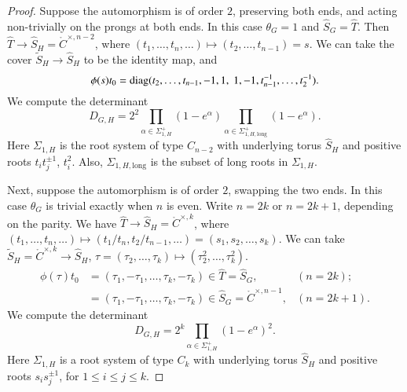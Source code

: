\begin{proof}
Suppose the automorphism is of order $2$, preserving both ends, and acting non-trivially on the prongs at both ends.
In this case $\theta_G=1$ and $\hat S_G = \hat T$.
Then $\hat T\to \hat S_H = \ring{C}^{\times,n-2}$, where $(t_1,\ldots,t_n,\ldots)\mapsto (t_2,\ldots,t_{n-1})=s$.
We can take the cover $\tilde S_H\to \hat S_H$ to be the identity map, and
\[
\phi(s)t_0 = \op{diag}(t_2,\ldots,t_{n-1},-1,1,\ 1,-1,t_{n-1}^{-1},\ldots,t_2^{-1}).
\]
We compute the determinant
\begin{equation}
D_{G,H} = 2^2 \prod_{\alpha\in \Sigma^+_{1,H}} (1-e^\alpha) \prod_{\alpha\in \Sigma^+_{1,H,\text{long}}} (1-e^\alpha).
\end{equation}
Here $\Sigma_{1,H}$ is the root system of type $C_{n-2}$ with underlying torus $\hat S_H$ and positive roots $t_i t_j^{\pm 1}$, $t_i^2$.
Also, $\Sigma_{1,H,\text{long}}$ is the subset of long roots in $\Sigma_{1,H}$.

Next, suppose the automorphism is of order $2$, swapping the two ends.
In this case $\theta_G$ is trivial exactly when $n$ is even.    
Write $n=2k$ or $n=2k+1$, depending on the parity.
We have $\hat T\to \hat S_H = \ring{C}^{\times,k}$, where $(t_1,\ldots,t_n,\ldots)\mapsto (t_1/t_n,t_2/t_{n-1},\ldots) = (s_1,s_2,\ldots,s_k)$.
We can take $\tilde S_H =\ring{C}^{\times,k}\to \hat S_H$, $\tau = (\tau_2,\ldots,\tau_k)\mapsto (\tau_2^2,\ldots,\tau_k^2)$.
\begin{align*}
\phi(\tau)t_0 &= (\tau_1,-\tau_1,\ldots,\tau_k,-\tau_k) \in \hat T = \hat S_G, &(n=2k);\\
&= (\tau_1,-\tau_1,\ldots,\tau_k,-\tau_k)\in \hat S_G = \ring{C}^{\times,n-1}, &(n=2k+1).
\end{align*}
We compute the determinant
\begin{equation}
D_{G,H} = 2^k \prod_{\alpha\in\Sigma^+_{1,H}} (1-e^\alpha)^2.
\end{equation}
Here $\Sigma_{1,H}$ is a root system of type $C_k$ with underlying torus $\hat S_H$ and positive roots $s_i s_j^{\pm 1}$, for $1\le i\le j\le k$.


\end{proof}

